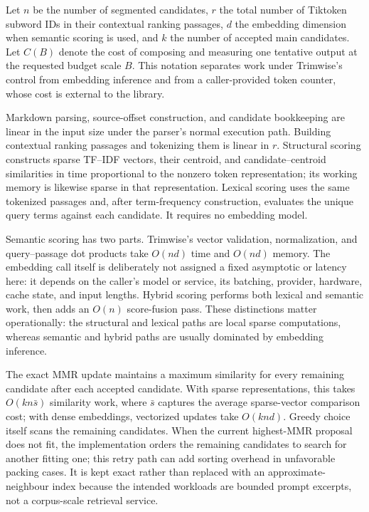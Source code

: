 \documentclass[
]{article}
\begin{document}
Let \(n\) be the number of segmented candidates, \(r\) the total number
of Tiktoken subword IDs in their contextual ranking passages, \(d\) the
embedding dimension when semantic scoring is used, and \(k\) the number
of accepted main candidates. Let \(C(B)\) denote the cost of composing
and measuring one tentative output at the requested budget scale \(B\).
This notation separates work under Trimwise's control from embedding
inference and from a caller-provided token counter, whose cost is
external to the library.

Markdown parsing, source-offset construction, and candidate bookkeeping
are linear in the input size under the parser's normal execution path.
Building contextual ranking passages and tokenizing them is linear in
\(r\). Structural scoring constructs sparse TF--IDF vectors, their
centroid, and candidate--centroid similarities in time proportional to
the nonzero token representation; its working memory is likewise sparse
in that representation. Lexical scoring uses the same tokenized passages
and, after term-frequency construction, evaluates the unique query terms
against each candidate. It requires no embedding model.

Semantic scoring has two parts. Trimwise's vector validation,
normalization, and query--passage dot products take \(O(nd)\) time and
\(O(nd)\) memory. The embedding call itself is deliberately not assigned
a fixed asymptotic or latency here: it depends on the caller's model or
service, its batching, provider, hardware, cache state, and input
lengths. Hybrid scoring performs both lexical and semantic work, then
adds an \(O(n)\) score-fusion pass. These distinctions matter
operationally: the structural and lexical paths are local sparse
computations, whereas semantic and hybrid paths are usually dominated by
embedding inference.

The exact MMR update maintains a maximum similarity for every remaining
candidate after each accepted candidate. With sparse representations,
this takes \(O(kn\bar{s})\) similarity work, where \(\bar{s}\) captures
the average sparse-vector comparison cost; with dense embeddings,
vectorized updates take \(O(knd)\). Greedy choice itself scans the
remaining candidates. When the current highest-MMR proposal does not
fit, the implementation orders the remaining candidates to search for
another fitting one; this retry path can add sorting overhead in
unfavorable packing cases. It is kept exact rather than replaced with an
approximate-neighbour index because the intended workloads are bounded
prompt excerpts, not a corpus-scale retrieval service.
\end{document}
